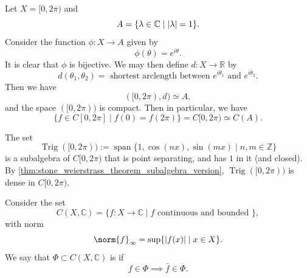\documentclass[notoc,notitlepage]{tufte-book}
\DeclareMathOperator{\Span}{span }
\DeclareMathOperator{\Trig}{Trig }
\begin{document}
\begin{eg}
  Let $X = [0, 2 \pi)$ and
  \begin{equation*}
    A = \{ \lambda \in \mathbb{C} \mid \left| \lambda \right| = 1 \}.
  \end{equation*}
  Consider the function $\phi : X \to A$ given by
  \begin{equation*}
    \phi(\theta) = e^{i \theta}.
  \end{equation*}
  It is clear that $\phi$ is bijective. We may then define $d : X \to \mathbb{R}$ by
  \begin{equation*}
    d(\theta_1, \theta_2) = \text{ shortest arclength between } e^{i \theta_1} \text{ and } e^{i \theta_2}.
  \end{equation*}
  Then we have
  \begin{equation*}
    ([0, 2 \pi), d) \simeq A,
  \end{equation*}
  and the space $([0, 2 \pi))$ is compact. Then in particular, we have
  \begin{equation*}
    \{ f \in C[0, 2 \pi] \mid f(0) = f(2 \pi) \} = C[0, 2 \pi) \simeq C(A).
  \end{equation*}
\end{eg}

\begin{eg}
  The set
  \begin{equation*}
    \Trig([0, 2 \pi)) := \Span \{ 1, \cos ( n x ), \sin ( m x ) \mid n, m \in \mathbb{Z} \}
  \end{equation*}
  is a subalgebra of $C[0, 2 \pi)$ that is point separating, and has $1$ in it (and closed). By \cref{thm:stone_weierstrass_theorem_subalgebra_version}, $\Trig([0, 2 \pi))$ is dense in $C[0, 2 \pi)$.
\end{eg}

\begin{note}
  Consider the set
  \begin{equation*}
    C(X, \mathbb{C}) = \{ f : X \to \mathbb{C} \mid f \text{ continuous and bounded } \},
  \end{equation*}
  with norm
  \begin{equation*}
    \norm{ f }_\infty = \sup \{ \abs{ f(x) } \mid x \in X \}.
  \end{equation*}
  We say that $\Phi \subset C(X, \mathbb{C})$ is  if
  \begin{equation*}
    f \in \Phi \implies \bar{f} \in \Phi.
  \end{equation*}
\end{note}
\end{document}
